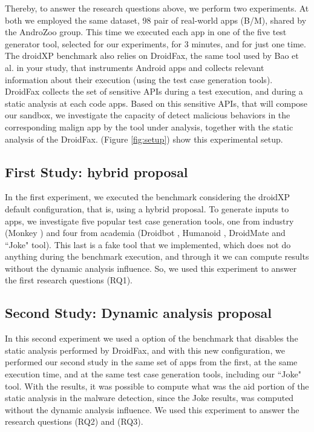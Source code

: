 Thereby, to answer the research questions above, we perform two experiments. At both we employed the same dataset, 98 pair of real-world apps (B/M), shared by the AndroZoo \cite{DBLP:conf/msr/AllixBKT16} group. This time we executed each app in one of the five test generator tool, selected for our experiments, for 3 minutes, and for just one time. The droidXP benchmark also relies on DroidFax, the same tool used by Bao et al. in your study, that instruments Android apps and collects relevant information about their execution (using the test case generation tools). DroidFax collects the set of sensitive APIs during a test execution, and during a static analysis at each code apps. Based on this sensitive APIs, that will compose our sandbox, we investigate the capacity of detect malicious behaviors in the corresponding malign app by the tool under analysis, together with the static analysis of the DroidFax. (Figure \ref{fig:setup}) show this experimental setup.

\subsection{First Study: hybrid proposal}

In the first experiment, we executed the benchmark considering the droidXP default configuration, that is, using a hybrid proposal. To generate inputs to apps, we investigate five popular test case generation tools, one from industry (Monkey \cite{Monkey}) and four from academia (Droidbot \cite{DBLP:conf/icse/LiYGC17}, Humanoid \cite{DBLP:conf/kbse/LiY0C19}, DroidMate \cite{DBLP:conf/icse/JamrozikZ16} and ``Joke" tool). This last is a fake tool that we implemented, which does not do anything during the benchmark execution, and through it we can compute results without the dynamic analysis influence. So, we used this experiment to answer the first research questions (RQ1).

\subsection{Second Study: Dynamic analysis proposal}

In this second experiment we used a option of the benchmark that disables the static analysis performed by DroidFax, and with this new configuration, we performed our second study in the same set of apps from the first, at the same execution time, and at the same test case generation tools, including our ``Joke" tool. With the results, it was possible to compute what was the aid portion of the static analysis in the malware detection, since the Joke results, was computed without the dynamic analysis influence. We used this experiment to answer the research questions (RQ2) and (RQ3).



